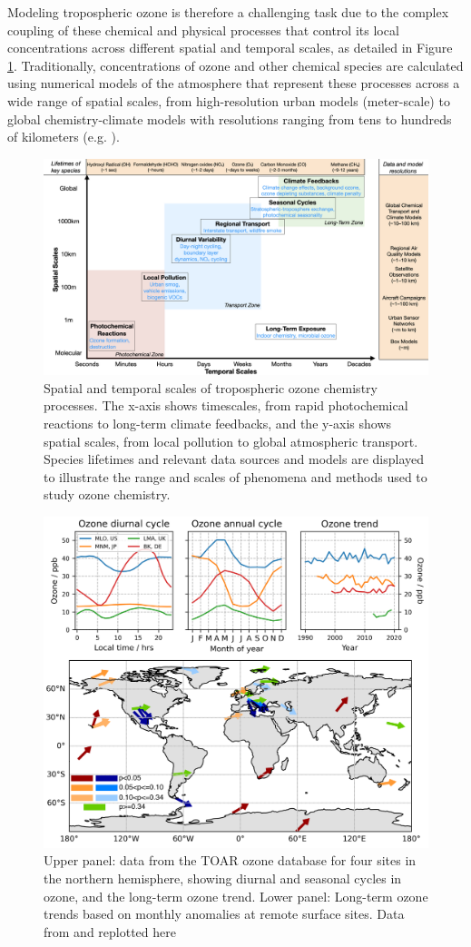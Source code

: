 \documentclass[gmd, manuscript]{copernicus}
\begin{document}
Modeling tropospheric ozone is therefore a challenging task due to the complex coupling of these chemical and physical processes that control its local concentrations across different spatial and temporal scales, as detailed in Figure \ref{fig:difficulties1}. Traditionally, concentrations of ozone and other chemical species are calculated using numerical models of the atmosphere that represent these processes across a wide range of spatial scales, from high-resolution urban models (meter-scale) to global chemistry-climate models with resolutions ranging from tens to hundreds of kilometers (e.g. \citet{Morgenstern2017}). 


\begin{figure}
    \centering
    \includegraphics[width=0.85\linewidth]{figures/timeScales_Fig_ML4O3.001.png}
    \caption{Spatial and temporal scales of tropospheric ozone chemistry processes. The x-axis shows timescales, from rapid photochemical reactions to long-term climate feedbacks, and the y-axis shows spatial scales, from local pollution to global atmospheric transport. Species lifetimes and relevant data sources and models are displayed to illustrate the range and scales of phenomena and methods used to study ozone chemistry.}
    \label{fig:difficulties1}
\end{figure}


\begin{figure}
    \centering
    \includegraphics[width=0.7\linewidth]{figures/ozone_is_hard.png}
    \caption{Upper panel: data from the TOAR ozone database for four sites in the northern hemisphere, showing diurnal and seasonal cycles in ozone, and the long-term ozone trend.   Lower panel: Long-term ozone trends based on monthly anomalies at remote surface sites.  Data from \citet{cooper_multi-decadal_2020} and replotted here}
    \label{fig:difficulties2}
\end{figure}
\end{document}
